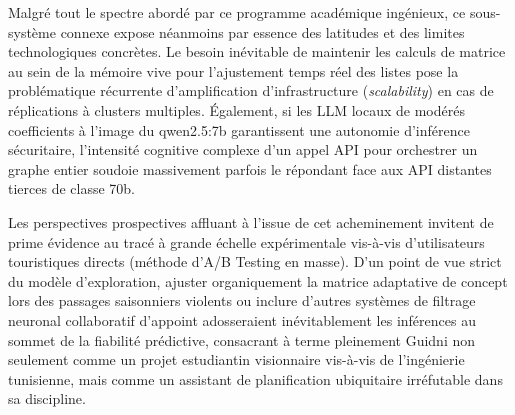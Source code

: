 Malgré tout le spectre abordé par ce programme académique ingénieux, ce sous-système connexe expose néanmoins par essence des latitudes et des limites technologiques concrètes. Le besoin inévitable de maintenir les calculs de matrice au sein de la mémoire vive pour l'ajustement temps réel des listes pose la problématique récurrente d'amplification d'infrastructure (\textit{scalability}) en cas de réplications à clusters multiples. Également, si les LLM locaux de modérés coefficients à l'image du qwen2.5:7b garantissent une autonomie d'inférence sécuritaire, l'intensité cognitive complexe d'un appel API pour orchestrer un graphe entier soudoie massivement parfois le répondant face aux API distantes tierces de classe 70b.

Les perspectives prospectives affluant à l'issue de cet acheminement invitent de prime évidence au tracé à grande échelle expérimentale vis-à-vis d'utilisateurs touristiques directs (méthode d'A/B Testing en masse). D'un point de vue strict du modèle d'exploration, ajuster organiquement la matrice adaptative de concept lors des passages saisonniers violents ou inclure d'autres systèmes de filtrage neuronal collaboratif d'appoint adosseraient inévitablement les inférences au sommet de la fiabilité prédictive, consacrant à terme pleinement Guidni non seulement comme un projet estudiantin visionnaire vis-à-vis de l'ingénierie tunisienne, mais comme un assistant de planification ubiquitaire irréfutable dans sa discipline.